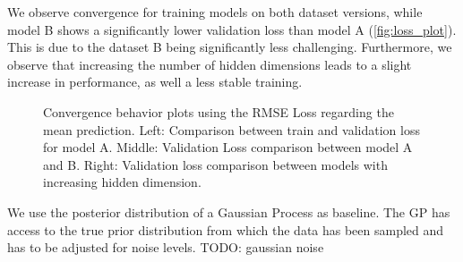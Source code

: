 We observe convergence for training models on both dataset versions, while model B shows a significantly lower validation loss than model A (\autoref{fig:loss_plot}). This is due to the dataset B being significantly less challenging. Furthermore, we observe that increasing the number of hidden dimensions leads to a slight increase in performance, as well a less stable training.

\begin{figure*}
	\centering
	\resizebox{0.9\textwidth}{!}{
		
		
		
	}
\caption{Convergence behavior plots using the RMSE Loss regarding the mean prediction. Left: Comparison between train and validation loss for model A. Middle: Validation Loss comparison between model A and B. Right: Validation loss comparison between models with increasing hidden dimension.}
\label{fig:loss_plot}
\end{figure*}

We use the posterior distribution of a Gaussian Process as baseline. The GP has access to the true prior distribution from which the data has been sampled and has to be adjusted for noise levels. TODO: gaussian noise


